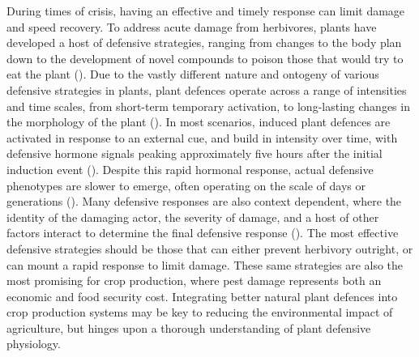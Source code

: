 \documentclass[12pt, letterpaper, ]{article}
\begin{document}
During times of crisis, having an effective and timely response can limit damage and speed recovery. To address acute damage from herbivores, plants have developed a host of defensive strategies, ranging from changes to the body plan down to the development of novel compounds to poison those that would try to eat the plant (\cite{agrawal_plant_2006}). Due to the vastly different nature and ontogeny of various defensive strategies in plants, plant defences operate across a range of intensities and time scales, from short-term temporary activation, to long-lasting changes in the morphology of the plant (\cite{agrawal_plant_2006, karban_induced_1989}). In most scenarios, induced plant defences are activated in response to an external cue, and build in intensity over time, with defensive hormone signals peaking approximately five hours after the initial induction event (\cite{schmelz_quantitative_2003}). Despite this rapid hormonal response, actual defensive phenotypes are slower to emerge, often operating on the scale of days or generations (\cite{karban_induced_1989}). Many defensive responses are also context dependent, where the identity of the damaging actor, the severity of damage, and a host of other factors interact to determine the final defensive response (\cite{waterman_simulated_2019}). The most effective defensive strategies should be those that can either prevent herbivory outright, or can mount a rapid response to limit damage. These same strategies are also the most promising for crop production, where pest damage represents both an economic and food security cost. Integrating better natural plant defences into crop production systems may be key to reducing the environmental impact of agriculture, but hinges upon a thorough understanding of plant defensive physiology.
\end{document}

